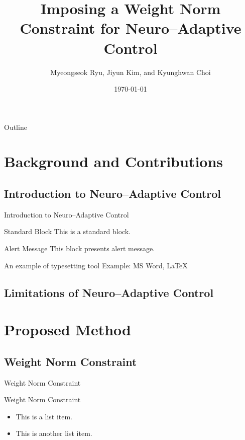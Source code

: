 \documentclass[aspectratio=169]{beamer}
\title{
    Imposing a Weight Norm Constraint for Neuro–Adaptive Control 
}
\author{Myeongseok Ryu\inst{1}, Jiyun Kim\inst{2}, and Kyunghwan Choi\inst{1}}
\date{\today}
\institute %
{
  \inst{1}%
  Department of Mechanical and Robotics Engineering\\
  Gwangju Institute of Science and Technology 
  \and
  \inst{2}%
  AI Graduate School\\
  Gwangju Institute of Science and Technology 
}
\begin{document}
\begin{frame}
    \titlepage 
\end{frame}

\begin{frame}{Outline}
    \tableofcontents
\end{frame}

\section{Background and Contributions}

\subsection{Introduction to Neuro–Adaptive Control}

\begin{frame}{Introduction to Neuro–Adaptive Control}

    \begin{block}{Standard Block}
        This is a standard block.
    \end{block}
    \begin{alertblock}{Alert Message}
        This block presents alert message.
    \end{alertblock}
    \begin{exampleblock}{An example of typesetting tool}
        Example: MS Word, \LaTeX{}
    \end{exampleblock}

\end{frame} 

\subsection{Limitations of Neuro–Adaptive Control}

\begin{frame}

\end{frame}

\section{Proposed Method}
\subsection{Weight Norm Constraint}
\begin{frame}{Weight Norm Constraint}
    \begin{block}{Weight Norm Constraint}
        \begin{itemize}
            \item This is a list item.
            \item This is another list item.
        \end{itemize}
    \end{block}
\end{frame}
\end{document}

